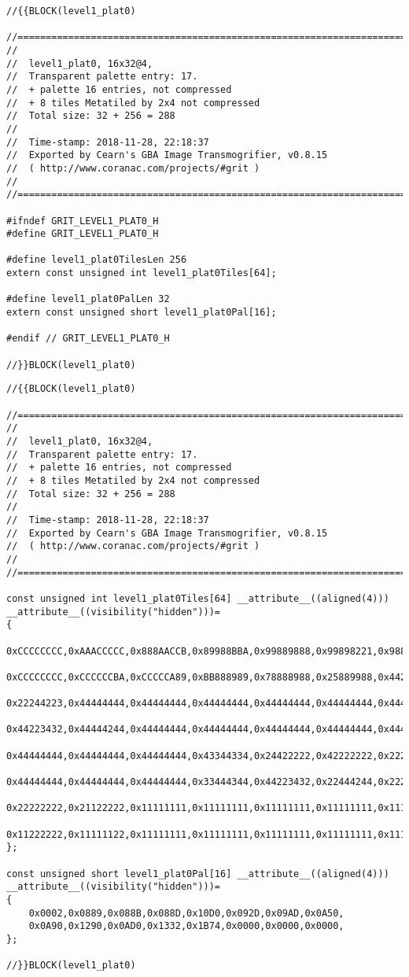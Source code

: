 \begin{lstlisting}[caption={Cabeçalho da parte superior da imagem da plataforma da primeira fase.},label={lst:imageheader}]
//{{BLOCK(level1_plat0)

//======================================================================
//
//  level1_plat0, 16x32@4,
//  Transparent palette entry: 17.
//  + palette 16 entries, not compressed
//  + 8 tiles Metatiled by 2x4 not compressed
//  Total size: 32 + 256 = 288
//
//  Time-stamp: 2018-11-28, 22:18:37
//  Exported by Cearn's GBA Image Transmogrifier, v0.8.15
//  ( http://www.coranac.com/projects/#grit )
//
//======================================================================

#ifndef GRIT_LEVEL1_PLAT0_H
#define GRIT_LEVEL1_PLAT0_H

#define level1_plat0TilesLen 256
extern const unsigned int level1_plat0Tiles[64];

#define level1_plat0PalLen 32
extern const unsigned short level1_plat0Pal[16];

#endif // GRIT_LEVEL1_PLAT0_H

//}}BLOCK(level1_plat0)
\end{lstlisting}

\begin{lstlisting}[caption={Código fonte da parte superior da imagem da plataforma da primeira fase.},label={lst:imagecpp}]
//{{BLOCK(level1_plat0)

//======================================================================
//
//  level1_plat0, 16x32@4,
//  Transparent palette entry: 17.
//  + palette 16 entries, not compressed
//  + 8 tiles Metatiled by 2x4 not compressed
//  Total size: 32 + 256 = 288
//
//  Time-stamp: 2018-11-28, 22:18:37
//  Exported by Cearn's GBA Image Transmogrifier, v0.8.15
//  ( http://www.coranac.com/projects/#grit )
//
//======================================================================

const unsigned int level1_plat0Tiles[64] __attribute__((aligned(4))) __attribute__((visibility("hidden")))=
{
    0xCCCCCCCC,0xAAACCCCC,0x888AACCB,0x89988BBA,0x99889888,0x99898221,0x98822222,0x81122444,
    0xCCCCCCCC,0xCCCCCCBA,0xCCCCCA89,0xBB888989,0x78888988,0x25889988,0x44225889,0x22444168,
    0x22244223,0x44444444,0x44444444,0x44444444,0x44444444,0x44444444,0x44444444,0x44444444,
    0x44223432,0x44444244,0x44444444,0x44444444,0x44444444,0x44444444,0x44444444,0x44444444,
    0x44444444,0x44444444,0x44444444,0x43344334,0x24422222,0x42222222,0x22222222,0x22222222,
    0x44444444,0x44444444,0x44444444,0x33444344,0x44223432,0x22444244,0x22222222,0x11222222,
    0x22222222,0x21122222,0x11111111,0x11111111,0x11111111,0x11111111,0x11111111,0x11111111,
    0x11222222,0x11111122,0x11111111,0x11111111,0x11111111,0x11111111,0x11111111,0x11111111,
};

const unsigned short level1_plat0Pal[16] __attribute__((aligned(4))) __attribute__((visibility("hidden")))=
{
    0x0002,0x0889,0x088B,0x088D,0x10D0,0x092D,0x09AD,0x0A50,
    0x0A90,0x1290,0x0AD0,0x1332,0x1B74,0x0000,0x0000,0x0000,
};

//}}BLOCK(level1_plat0)
\end{lstlisting}

